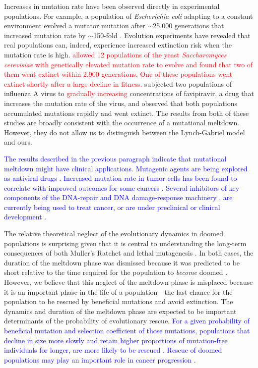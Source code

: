 \documentclass[9pt,lineno]{elife}
\newcommand{\blue}{\textcolor{blue}}
\newcommand{\red}{\textcolor{red}}
\begin{document}
Increases in mutation rate have been observed directly in experimental populations.  For example, a population of \emph{Escherichia coli} adapting to a constant environment evolved a mutator mutation after $\sim$25,000  generations that increased mutation rate by $\sim$150-fold \citep{bar09, wie13}.
%
Evolution experiments have revealed that real populations can, indeed, experience  increased extinction risk when the mutation rate is high.  
%
\red{\citet{zey01a} allowed 12 populations of the yeast \textit{Saccharomyces cerevisiae} with genetically elevated mutation rate to evolve and found that two of them went extinct within 2,900 generations.  One of these populations went extinct shortly after a large decline in fitness.}
%
\citet{ban16} subjected two populations of influenza A virus to \red{gradually increasing} concentrations of favipiravir, a drug that increases the mutation rate of the virus, and observed that both populations accumulated mutations rapidly and went extinct. 
%
The results from both of these studies are broadly consistent with the occurrence of a mutational meltdown.  However, they do not allow us to distinguish between the Lynch-Gabriel model and ours.

\blue{The results described in the previous paragraph indicate that mutational meltdown might have clinical applications.  
%
Mutagenic agents are being explored as antiviral drugs \citep{loe99, cro01, par01, ban16}.
%
Increased mutation rate in tumor cells has been found to correlate with improved outcomes for some cancers \citep{sil00, bir11, and16}.  
%
Several inhibitors of key components of the DNA-repair and DNA damage-response machinery \citep[e.g., PARP inhibitors,][]{lor15}, are currently being used to treat cancer, or are under preclinical or clinical development \citep{bro17}.}

The relative theoretical neglect of the evolutionary dynamics in doomed populations is surprising given that it is central to understanding the long-term consequences of both Muller's Ratchet \citep{Lynch_MUTATION_1990,lyn93,Gabriel_MULLER_1993,lyn95} and lethal mutagenesis \citep{Bull_Theory_2007, mat17}.  
%
In both cases, the duration of the meltdown phase was dismissed because it was predicted to be short relative to the time required for the population to \textit{become} doomed \citep{lyn93,lyn95,Bull_Theory_2007}.
%
However, we believe that this neglect of the meltdown phase is misplaced because it
is an important phase in the life of a population---the last chance for the population to be rescued by beneficial mutations and avoid extinction.  The dynamics and duration of the meltdown phase are expected to be important determinants of the probability of evolutionary rescue.  \blue{For a given probability of beneficial mutation and selection coefficient of those mutations, populations that decline in size more slowly and retain higher proportions of mutation-free individuals for longer, are more likely to be rescued \citep{mar13}.  
%
Rescue of doomed populations may play an important role in cancer progression \citep{McFarland_Impact_2013, McFarland_Tug_2014}.}
\end{document}

